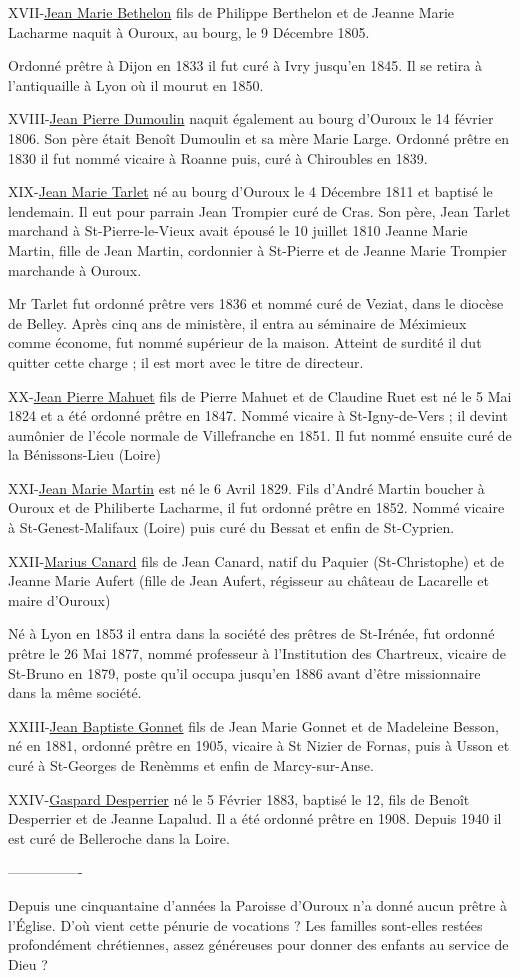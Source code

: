 XVII-\underline{Jean Marie Bethelon} fils de Philippe Berthelon et de Jeanne Marie Lacharme naquit à Ouroux, au bourg, le 9 Décembre 1805.

Ordonné prêtre à Dijon en 1833 il fut curé à Ivry jusqu'en 1845. Il se retira à l'antiquaille à Lyon où il mourut en 1850.

XVIII-\underline{Jean Pierre Dumoulin} naquit également au bourg d'Ouroux le 14 février 1806. Son père était Benoît Dumoulin et sa mère Marie Large. Ordonné prêtre en 1830 il fut nommé vicaire à Roanne puis, curé à Chiroubles en 1839.

XIX-\underline{Jean Marie Tarlet} né au bourg d'Ouroux le 4 Décembre 1811 et baptisé le lendemain. Il eut pour parrain Jean Trompier curé de Cras. Son père, Jean Tarlet marchand à St-Pierre-le-Vieux avait épousé le 10 juillet 1810 Jeanne Marie Martin, fille de Jean Martin, cordonnier à St-Pierre et de Jeanne Marie Trompier marchande à Ouroux.

Mr Tarlet fut ordonné prêtre vers 1836 et nommé curé de Veziat, dans le diocèse de Belley. Après cinq ans de ministère, il entra au séminaire de Méximieux comme économe, fut nommé supérieur de la maison. Atteint de surdité il dut quitter cette charge ; il est mort avec le titre de directeur.

XX-\underline{Jean Pierre Mahuet} fils de Pierre Mahuet et de Claudine Ruet est né le 5 Mai 1824 et a été ordonné prêtre en 1847. Nommé vicaire à St-Igny-de-Vers ; il devint aumônier de l'école normale de Villefranche en 1851. Il fut nommé ensuite curé de la Bénissons-Lieu (Loire)

XXI-\underline{Jean Marie Martin} est né le 6 Avril 1829. Fils d'André Martin boucher à Ouroux et de Philiberte Lacharme, il fut ordonné prêtre en 1852. Nommé vicaire à St-Genest-Malifaux (Loire) puis curé du Bessat et enfin de St-Cyprien.

XXII-\underline{Marius Canard} fils de Jean Canard, natif du Paquier (St-Christophe) et de Jeanne Marie Aufert (fille de Jean Aufert, régisseur au château de Lacarelle et maire d'Ouroux)

Né à Lyon en 1853 il entra dans la société des prêtres de St-Irénée, fut ordonné prêtre le 26 Mai 1877, nommé professeur à l'Institution des Chartreux, vicaire de St-Bruno en 1879, poste qu'il occupa jusqu'en 1886 avant d'être missionnaire dans la même société.

XXIII-\underline{Jean Baptiste Gonnet} fils de Jean Marie Gonnet et de Madeleine Besson, né en 1881, ordonné prêtre en 1905, vicaire à St Nizier de Fornas, puis à Usson et curé à St-Georges de Renèmms et enfin de Marcy-sur-Anse.

XXIV-\underline{Gaspard Desperrier} né le 5 Février 1883, baptisé le 12, fils de Benoît Desperrier et de Jeanne Lapalud. Il a été ordonné prêtre en 1908. Depuis 1940 il est curé de Belleroche dans la Loire.

----------------

Depuis une cinquantaine d'années la Paroisse d'Ouroux n'a donné aucun prêtre à l'Église. D'où vient cette pénurie de vocations ? Les familles sont-elles restées profondément chrétiennes, assez généreuses pour donner des enfants au service de Dieu ?
